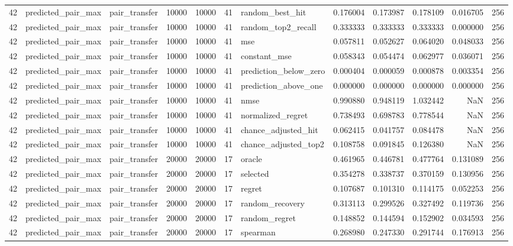 \begin{tabular}{rllrrrlrrrrr}
42 & predicted_pair_max & pair_transfer & 10000 & 10000 & 41 & random_best_hit & 0.176004 & 0.173987 & 0.178109 & 0.016705 & 256 \\
42 & predicted_pair_max & pair_transfer & 10000 & 10000 & 41 & random_top2_recall & 0.333333 & 0.333333 & 0.333333 & 0.000000 & 256 \\
42 & predicted_pair_max & pair_transfer & 10000 & 10000 & 41 & mse & 0.057811 & 0.052627 & 0.064020 & 0.048033 & 256 \\
42 & predicted_pair_max & pair_transfer & 10000 & 10000 & 41 & constant_mse & 0.058343 & 0.054474 & 0.062977 & 0.036071 & 256 \\
42 & predicted_pair_max & pair_transfer & 10000 & 10000 & 41 & prediction_below_zero & 0.000404 & 0.000059 & 0.000878 & 0.003354 & 256 \\
42 & predicted_pair_max & pair_transfer & 10000 & 10000 & 41 & prediction_above_one & 0.000000 & 0.000000 & 0.000000 & 0.000000 & 256 \\
42 & predicted_pair_max & pair_transfer & 10000 & 10000 & 41 & nmse & 0.990880 & 0.948119 & 1.032442 & NaN & 256 \\
42 & predicted_pair_max & pair_transfer & 10000 & 10000 & 41 & normalized_regret & 0.738493 & 0.698783 & 0.778544 & NaN & 256 \\
42 & predicted_pair_max & pair_transfer & 10000 & 10000 & 41 & chance_adjusted_hit & 0.062415 & 0.041757 & 0.084478 & NaN & 256 \\
42 & predicted_pair_max & pair_transfer & 10000 & 10000 & 41 & chance_adjusted_top2 & 0.108758 & 0.091845 & 0.126380 & NaN & 256 \\
42 & predicted_pair_max & pair_transfer & 20000 & 20000 & 17 & oracle & 0.461965 & 0.446781 & 0.477764 & 0.131089 & 256 \\
42 & predicted_pair_max & pair_transfer & 20000 & 20000 & 17 & selected & 0.354278 & 0.338737 & 0.370159 & 0.130956 & 256 \\
42 & predicted_pair_max & pair_transfer & 20000 & 20000 & 17 & regret & 0.107687 & 0.101310 & 0.114175 & 0.052253 & 256 \\
42 & predicted_pair_max & pair_transfer & 20000 & 20000 & 17 & random_recovery & 0.313113 & 0.299526 & 0.327492 & 0.119736 & 256 \\
42 & predicted_pair_max & pair_transfer & 20000 & 20000 & 17 & random_regret & 0.148852 & 0.144594 & 0.152902 & 0.034593 & 256 \\
42 & predicted_pair_max & pair_transfer & 20000 & 20000 & 17 & spearman & 0.268980 & 0.247330 & 0.291744 & 0.176913 & 256 \\

\end{tabular}
